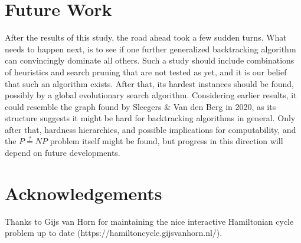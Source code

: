 \documentclass[10pt,conference,compsocconf]{IEEEtran}
\begin{document}
\section{Future Work}

\noindent After the results of this study, the road ahead took a few sudden turns. What needs to happen next, is to see if one further generalized backtracking algorithm can convincingly dominate all others. Such a study should include combinations of heuristics and search pruning that are not tested as yet, and it is our belief that such an algorithm exists. After that, its hardest instances should be found, possibly by a global evolutionary search algorithm. Considering earlier results, it could resemble the graph found by Sleegers \& Van den Berg in 2020, as its structure suggests it might be hard for backtracking algorithms in general. Only after that, hardness hierarchies, and possible  implications for computability, and the $P\stackrel{?}{=}NP$ problem itself might be found, but progress in this direction will depend on future developments.

\section{Acknowledgements}

Thanks to Gijs van Horn for maintaining the nice interactive Hamiltonian cycle problem up to date (https://hamiltoncycle.gijsvanhorn.nl/). 
















\end{document}
